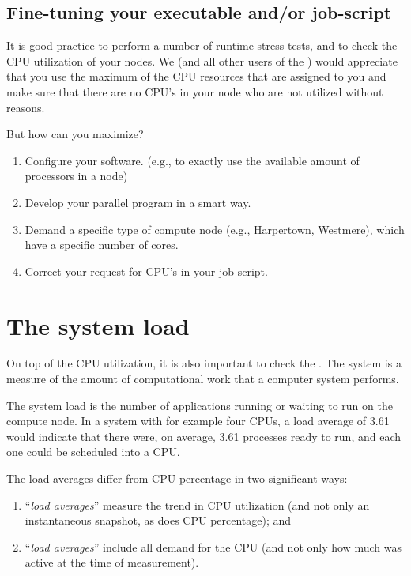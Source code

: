 \subsection{Fine-tuning your executable and/or job-script}

It is good practice to perform a number of runtime stress tests, and to check
the CPU utilization of your nodes. We (and all other users of the \hpc) would
appreciate that you use the maximum of the CPU resources that are assigned to
you and make sure that there are no CPU's in your node who are not utilized
without reasons.

But how can you maximize?

\begin{enumerate}
\item  Configure your software. (e.g., to exactly use the available amount of processors in a node)
\item  Develop your parallel program in a smart way.
\item  Demand a specific type of compute node (e.g., Harpertown, Westmere), which have a specific number of cores.
\item  Correct your request for CPU's in your job-script.
\end{enumerate}

\section{The system load}

On top of the CPU utilization, it is also important to check the .  The system  is a measure of the amount of computational
work that a computer system performs.

The system load is the number of applications running or waiting to run on the
compute node.  In a system with for example four CPUs, a load average of 3.61
would indicate that there were, on average, 3.61 processes ready to run, and
each one could be scheduled into a CPU.

The load averages differ from CPU percentage in two significant ways:

\begin{enumerate}
\item  ``\emph{load averages}'' measure the trend in CPU utilization (and not only an instantaneous snapshot, as does CPU percentage); and
\item  ``\emph{load averages}'' include all demand for the CPU (and not only how much was active at the time of measurement).
\end{enumerate}

